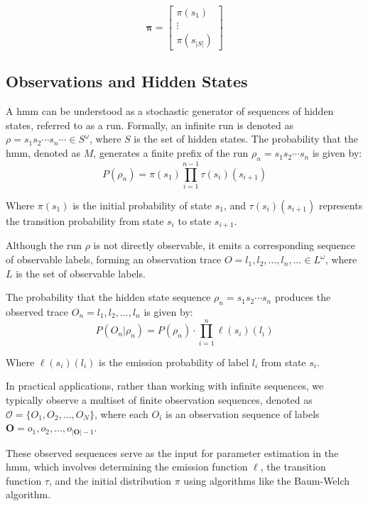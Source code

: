 \[
    \pmb{\pi} = \begin{bmatrix}
              \pi(s_1) \\
              \vdots   \\
              \pi(s_{|S|})
    \end{bmatrix}
\]

\subsection{Observations and Hidden States}\label{subsec:observations-hidden-states}
A \gls{hmm} can be understood as a stochastic generator of sequences of hidden states, referred to as a run. 
Formally, an infinite run is denoted as $\rho = s_1 s_2 \cdots s_n \cdots \in S^{\omega}$, where $S$ is the set of hidden states. 
The probability that the \gls{hmm}, denoted as $M$, generates a finite prefix of the run $\rho_n = s_1 s_2 \cdots s_n$ is given by:
\begin{equation}
    P(\rho_n) = \pi(s_1) \prod_{i = 1}^{n-1} \tau(s_i)(s_{i+1})
\end{equation}

Where $\pi(s_1)$ is the initial probability of state $s_1$, and $\tau(s_i)(s_{i+1})$ represents the transition probability from state $s_i$ to state $s_{i+1}$.

Although the run $\rho$ is not directly observable, it emits a corresponding sequence of observable labels, forming an observation trace $O = l_1, l_2, \ldots, l_n, \ldots \in L^{\omega}$, where $L$ is the set of observable labels.

The probability that the hidden state sequence $\rho_n = s_1 s_2 \cdots s_n$ produces the observed trace $O_n = l_1, l_2, \ldots, l_n$ is given by:
\begin{equation}
    P(O_n | \rho_n) = P(\rho_n) \cdot \prod_{i = 1}^{n} \ell(s_i)(l_i)
\end{equation}

Where $\ell(s_i)(l_i)$ is the emission probability of label $l_i$ from state $s_i$.

In practical applications, rather than working with infinite sequences, we typically observe a multiset of finite observation sequences, denoted as $\mathcal{O} = \{O_1, O_2, \ldots, O_N\}$, where each $O_i$ is an observation sequence of labels $\mathbf{O} = o_1, o_2, \ldots, o_{|\mathbf{O}|-1}$.

These observed sequences serve as the input for parameter estimation in the \gls{hmm}, which involves determining the emission function $\ell$, the transition function $\tau$, and the initial distribution $\pi$ using algorithms like the Baum-Welch algorithm.

